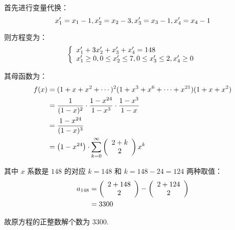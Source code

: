 \documentclass[cn, hazy, blue, normal, 12pt]{elegantnote}
\begin{document}
\begin{solution}[print=true]

    首先进行变量代换：
    \begin{equation}
        \notag
        x_1^{\prime} = x_1-1,
        x_2^{\prime} = x_2-3,
        x_3^{\prime} = x_3-1,
        x_4^{\prime} = x_4-1
    \end{equation}

    则方程变为：
    \begin{equation}
        \notag
        \left\{
        \begin{array}{l}
            x_1^{\prime} + 3 x_2^{\prime} + x_3^{\prime} + x_4^{\prime} = 148 \\
            x_1^{\prime} \geq 0,
            0 \leq x_2^{\prime} \leq 7,
            0 \leq x_3^{\prime} \leq 2,
            x_4^{\prime} \geq 0
        \end{array}
        \right.
    \end{equation}

    其母函数为：
    \begin{equation}
        \notag
        \begin{aligned}
            f(x) & = (1+x+x^2+\cdots)^2
            (1+x^3+x^6+\cdots+x^{21})
            (1+x+x^2)                            \\
                 & = \dfrac{1}{(1-x)^2} \cdot
            \dfrac{1-x^{24}}{1-x^3} \cdot
            \dfrac{1-x^3}{1-x}                   \\
                 & = \dfrac{1-x^{24}}{(1-x)^3}   \\
                 & = \left(1-x^{24}\right) \cdot
            \sum_{k=0}^{\infty} {\left(
                \begin{array}{c} 2+k \\ 2 \end{array}
                \right) x^k}
        \end{aligned}
    \end{equation}

    其中 $x$ 系数是 $148$ 的对应 $k=148$ 和 $k=148-24=124$ 两种取值：
    \begin{equation}
        \notag
        \begin{aligned}
            a_{148}
             & = \left(
            \begin{array}{c} 2+148 \\ 2 \end{array}
            \right) -
            \left(
            \begin{array}{c} 2+124 \\ 2 \end{array}
            \right)     \\
             & = 3300
        \end{aligned}
    \end{equation}

    故原方程的正整数解个数为 $3300$.

\end{solution}
\end{document}
